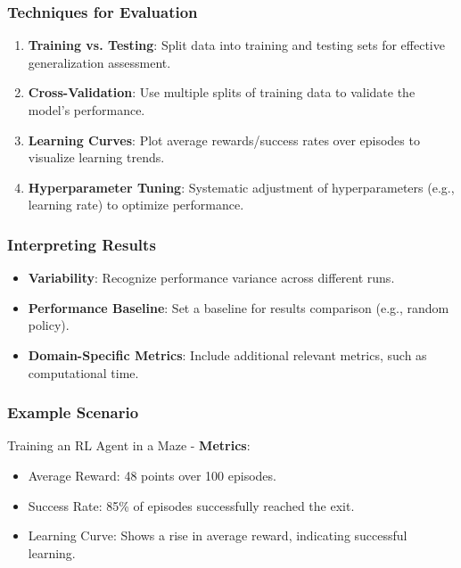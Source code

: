 \documentclass[aspectratio=169]{beamer}
\begin{document}
\begin{frame}[fragile]
    \frametitle{Techniques for Evaluation}
    \begin{enumerate}
        \item \textbf{Training vs. Testing}:
            Split data into training and testing sets for effective generalization assessment.

        \item \textbf{Cross-Validation}:
            Use multiple splits of training data to validate the model's performance.

        \item \textbf{Learning Curves}:
            Plot average rewards/success rates over episodes to visualize learning trends.

        \item \textbf{Hyperparameter Tuning}:
            Systematic adjustment of hyperparameters (e.g., learning rate) to optimize performance.
    \end{enumerate}
\end{frame}

\begin{frame}[fragile]
    \frametitle{Interpreting Results}
    \begin{itemize}
        \item \textbf{Variability}: Recognize performance variance across different runs.
        \item \textbf{Performance Baseline}: Set a baseline for results comparison (e.g., random policy).
        \item \textbf{Domain-Specific Metrics}: Include additional relevant metrics, such as computational time.
    \end{itemize}
\end{frame}

\begin{frame}[fragile]
    \frametitle{Example Scenario}
    \begin{block}{Training an RL Agent in a Maze}
        - \textbf{Metrics}: 
        \begin{itemize}
            \item Average Reward: 48 points over 100 episodes.
            \item Success Rate: 85\% of episodes successfully reached the exit.
            \item Learning Curve: Shows a rise in average reward, indicating successful learning.
        \end{itemize}
    \end{block}
\end{frame}
\end{document}
